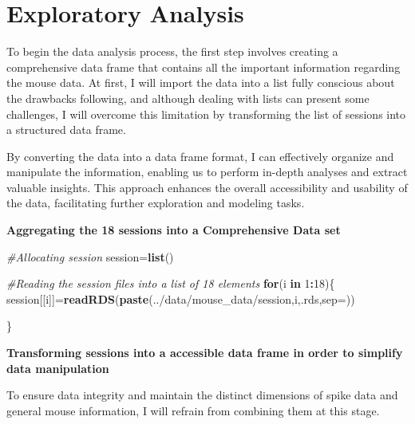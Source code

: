 \documentclass[
]{article}
\newenvironment{Shaded}{\begin{snugshade}}{\end{snugshade}}
\newcommand{\AttributeTok}[1]{\textcolor[rgb]{0.13,0.29,0.53}{#1}}
\newcommand{\CommentTok}[1]{\textcolor[rgb]{0.56,0.35,0.01}{\textit{#1}}}
\newcommand{\ControlFlowTok}[1]{\textcolor[rgb]{0.13,0.29,0.53}{\textbf{#1}}}
\newcommand{\DecValTok}[1]{\textcolor[rgb]{0.00,0.00,0.81}{#1}}
\newcommand{\FunctionTok}[1]{\textcolor[rgb]{0.13,0.29,0.53}{\textbf{#1}}}
\newcommand{\NormalTok}[1]{#1}
\newcommand{\OtherTok}[1]{\textcolor[rgb]{0.56,0.35,0.01}{#1}}
\newcommand{\SpecialCharTok}[1]{\textcolor[rgb]{0.81,0.36,0.00}{\textbf{#1}}}
\newcommand{\StringTok}[1]{\textcolor[rgb]{0.31,0.60,0.02}{#1}}
\begin{document}
\section{Exploratory Analysis}\label{exploratory-analysis}

To begin the data analysis process, the first step involves creating a
comprehensive data frame that contains all the important information
regarding the mouse data. At first, I will import the data into a list
fully conscious about the drawbacks following, and although dealing with
lists can present some challenges, I will overcome this limitation by
transforming the list of sessions into a structured data frame.

By converting the data into a data frame format, I can effectively
organize and manipulate the information, enabling us to perform in-depth
analyses and extract valuable insights. This approach enhances the
overall accessibility and usability of the data, facilitating further
exploration and modeling tasks.

\textbf{Aggregating the 18 sessions into a Comprehensive Data set}

\begin{Shaded}
\begin{Highlighting}[]
\CommentTok{\#Allocating session}
\NormalTok{session}\OtherTok{=}\FunctionTok{list}\NormalTok{()}

\CommentTok{\#Reading the session files into a list of 18 elements}
\ControlFlowTok{for}\NormalTok{(i }\ControlFlowTok{in} \DecValTok{1}\SpecialCharTok{:}\DecValTok{18}\NormalTok{)\{}
\NormalTok{  session[[i]]}\OtherTok{=}\FunctionTok{readRDS}\NormalTok{(}\FunctionTok{paste}\NormalTok{(}\StringTok{\textquotesingle{}../data/mouse\_data/session\textquotesingle{}}\NormalTok{,i,}\StringTok{\textquotesingle{}.rds\textquotesingle{}}\NormalTok{,}\AttributeTok{sep=}\StringTok{\textquotesingle{}\textquotesingle{}}\NormalTok{))}

  
\NormalTok{\}}
\end{Highlighting}
\end{Shaded}

\textbf{Transforming sessions into a accessible data frame in order to
simplify data manipulation}

To ensure data integrity and maintain the distinct dimensions of spike
data and general mouse information, I will refrain from combining them
at this stage.
\end{document}

